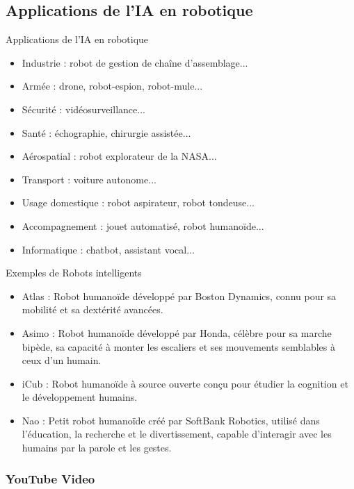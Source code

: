 \documentclass{beamer}
\begin{document}
\subsection{Applications de l'IA en robotique}
\begin{frame}{Applications de l'IA en robotique}
    \begin{itemize}
	\item Industrie : robot de gestion de chaîne d'assemblage...
	\item Armée : drone, robot-espion, robot-mule...
	\item Sécurité : vidéosurveillance...
	\item Santé : échographie, chirurgie assistée...
	\item Aérospatial : robot explorateur de la NASA...
	\item Transport : voiture autonome...
	\item Usage domestique : robot aspirateur, robot tondeuse...
	\item Accompagnement : jouet automatisé, robot humanoïde...
	\item Informatique : chatbot, assistant vocal...
\end{itemize}
\end{frame}

\begin{frame}{Exemples de Robots intelligents}
	\begin{itemize}
		\item Atlas : Robot humanoïde développé par Boston Dynamics, connu pour sa mobilité et sa dextérité avancées.
		\item Asimo : Robot humanoïde développé par Honda, célèbre pour sa marche bipède, sa capacité à monter les escaliers et ses mouvements semblables à ceux d'un humain.
		\item iCub : Robot humanoïde à source ouverte conçu pour étudier la cognition et le développement humains.
		\item Nao : Petit robot humanoïde créé par SoftBank Robotics, utilisé dans l'éducation, la recherche et le divertissement, capable d'interagir avec les humains par la parole et les gestes.
	\end{itemize}
\end{frame}

	
	
	\begin{frame}
		\frametitle{YouTube Video}
		
	\end{frame}
\end{document}
